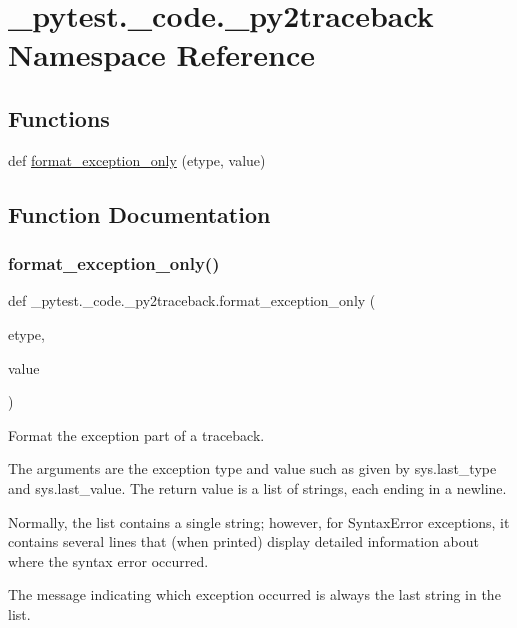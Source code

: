\hypertarget{namespace__pytest_1_1__code_1_1__py2traceback}{}\section{\+\_\+pytest.\+\_\+code.\+\_\+py2traceback Namespace Reference}
\label{namespace__pytest_1_1__code_1_1__py2traceback}
\subsection*{Functions}
\begin{DoxyCompactItemize}
\item 
def \hyperlink{namespace__pytest_1_1__code_1_1__py2traceback_ac1f73c403a15cfa4095e3d4f10a89d15}{format\+\_\+exception\+\_\+only} (etype, value)
\end{DoxyCompactItemize}


\subsection{Function Documentation}
\mbox{\label{namespace__pytest_1_1__code_1_1__py2traceback_ac1f73c403a15cfa4095e3d4f10a89d15}} 
\subsubsection{\texorpdfstring{format\+\_\+exception\+\_\+only()}{format\_exception\_only()}}
{\footnotesize\ttfamily def \+\_\+pytest.\+\_\+code.\+\_\+py2traceback.\+format\+\_\+exception\+\_\+only (\begin{DoxyParamCaption}\item[{}]{etype,  }\item[{}]{value }\end{DoxyParamCaption})}

\begin{DoxyVerb}Format the exception part of a traceback.

The arguments are the exception type and value such as given by
sys.last_type and sys.last_value. The return value is a list of
strings, each ending in a newline.

Normally, the list contains a single string; however, for
SyntaxError exceptions, it contains several lines that (when
printed) display detailed information about where the syntax
error occurred.

The message indicating which exception occurred is always the last
string in the list.\end{DoxyVerb}
 